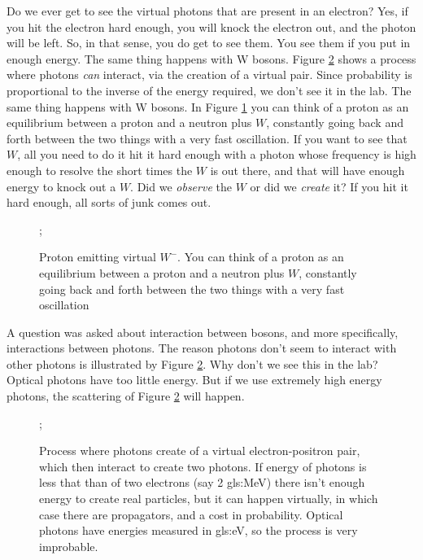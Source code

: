 \documentclass[]{article}
\begin{document}
Do we ever get to see the virtual photons that are present in an electron? Yes, if you hit the electron hard enough, you will knock the electron out, and the photon will be left. So, in that sense, you do get to see them. You see them if you put in enough energy. The same thing happens with W bosons.
Figure \ref{fig:2-6-photons} shows a process where photons \emph{can} interact, via the creation of a virtual pair. Since probability is proportional to the inverse of the energy required, we don't see it in the lab. The same thing happens with W bosons. In Figure \ref{fig:proton:emits:W} you can think of a proton as an equilibrium between a proton and a neutron plus $W$, constantly going back and forth between the two things with a very fast oscillation. If you want to see that $W$, all you need to do it hit it hard enough with a photon whose frequency is high enough to resolve the short times the $W$ is out there, and that will have enough energy to knock out a $W$. Did we \emph{observe} the $W$ or did we \emph{create} it? If you hit it hard enough, all sorts of junk comes out.

\begin{figure}[H]
	\begin{center}
		 \caption[Proton emitting virtual $W^-$]{Proton emitting virtual $W^-$. You can think of a proton as an equilibrium between a proton and a neutron plus $W$, constantly going back and forth between the two things with a very fast oscillation}\label{fig:proton:emits:W}
		 ;
	\end{center}
 \end{figure}
 
 A question was asked about interaction between bosons, and more specifically, interactions between photons. The reason photons don't seem to interact with other photons is illustrated by Figure \ref{fig:2-6-photons}. Why don't we see this in the lab? Optical photons have too little energy. But if we use extremely high energy photons, the scattering of Figure \ref{fig:2-6-photons} will happen.
 
 \begin{figure}[H]
 	\begin{center}
 		\caption[Photon interaction via the creation of a virtual pair]{Process where photons create of a virtual electron-positron pair, which then interact to create two photons. If energy of photons is less that than of two electrons (say 2 \gls{gls:MeV})  there isn't enough energy to create real particles, but it can happen virtually, in which case there are propagators, and a cost in probability. Optical photons have energies measured in \gls{gls:eV}, so the process is very improbable.}\label{fig:2-6-photons}
	 	;
	 \end{center}
 \end{figure}
\end{document}
